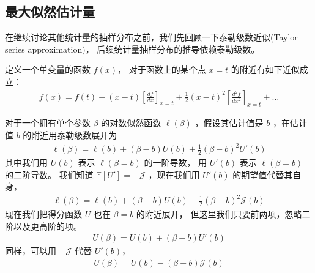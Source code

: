 \documentclass[letterpaper,10pt,english]{sphinxmanual}
\begin{document}
\subsection{最大似然估计量}
\label{\detokenize{_u6a21_u578b_u8bc4_u4f30/influence:ch-influence-ml-statistic}}\label{\detokenize{_u6a21_u578b_u8bc4_u4f30/influence:id4}}
在继续讨论其他统计量的抽样分布之前，我们先回顾一下泰勒级数近似(Taylor series approximation)，
后续统计量抽样分布的推导依赖泰勒级数。

定义一个单变量的函数 \(f(x)\)，
对于函数上的某个点 \(x=t\) 的附近有如下近似成立：
\begin{equation}\label{equation:模型评估/influence:模型评估/influence:20}
\begin{split}f(x) = f(t) + (x-t)\left[ \frac{df}{dx} \right]_{x=t}
+ \frac{1}{2}(x-t)^2 \left[ \frac{d^2f}{d x^2}  \right ]_{x=t}
+ \dots\end{split}
\end{equation}

对于一个拥有单个参数 \(\beta\) 的对数似然函数 \(\ell(\beta)\)
，假设其估计值是 \(b\)
，在估计值 \(b\) 的附近用泰勒级数展开为
\begin{equation}\label{equation:模型评估/influence:模型评估/influence:21}
\begin{split}\ell(\beta) = \ell(b) + (\beta-b)U(b)
+ \frac{1}{2}(\beta-b)^2 U'(b)\end{split}
\end{equation}
其中我们用 \(U(b)\) 表示 \(\ell(\beta=b)\) 的一阶导数，
用 \(U'(b)\) 表示 \(\ell(\beta=b)\) 的二阶导数。
我们知道 \(\mathbb{E}[U']=-\mathcal{J}\)
，现在我们用 \(U'(b)\) 的期望值代替其自身，
\begin{equation}\label{equation:模型评估/influence:模型评估/influence:22}
\begin{split}\ell(\beta) = \ell(b) + (\beta-b)U(b)
- \frac{1}{2}(\beta-b)^2 \mathcal{J}(b)\end{split}
\end{equation}
现在我们把得分函数 \(U\) 也在 \(\beta=b\) 的附近展开，
但这里我们只要前两项，忽略二阶以及更高阶的项。
\begin{equation}\label{equation:模型评估/influence:模型评估/influence:23}
\begin{split}U(\beta) = U(b) + (\beta-b) U'(b)\end{split}
\end{equation}
同样，可以用 \(-\mathcal{J}\) 代替 \(U'(b)\)，
\begin{equation}\label{equation:模型评估/influence:模型评估/influence:24}
\begin{split}U(\beta) = U(b) - (\beta-b) \mathcal{J}(b)\end{split}
\end{equation}
\end{document}
